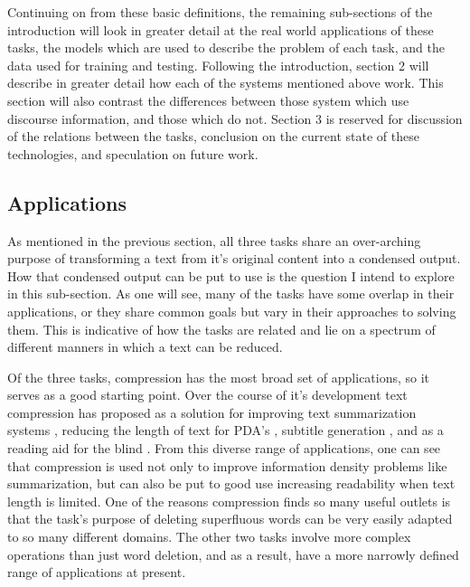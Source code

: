 {{Continuing on from these basic definitions, the remaining sub-sections of the introduction will look in greater detail at the real world applications of these tasks, the models which are used to describe the problem of each task, and the data used for training and testing.  Following the introduction, section 2 will describe in greater detail how each of the systems mentioned above work. This section will also contrast the differences between those system which use discourse information, and those which do not. Section 3 is reserved for discussion of the relations between the tasks, conclusion on the current state of these technologies, and speculation on future work.}


\subsection{Applications}


{As mentioned in the previous section, all three tasks share an over-arching purpose of transforming a text from it's original content into a condensed output. How that condensed output can be put to use is the question I intend to explore in this sub-section.  As one will see, many of the tasks have some overlap in their applications, or they share common goals but vary in their approaches to solving them.  This is indicative of how the tasks are related and lie on a spectrum of different manners in which a text can be reduced.}

{Of the three tasks, compression has the most broad set of applications, so it serves as a good starting point.  Over the course of it's development text compression has proposed as a solution for improving text summarization systems \citep{Jing:2000:SRA:974147.974190} \citep{Knight:2002:SBS:604203.604207} , reducing the length of text for PDA's \citep{corston2001text}, subtitle generation \citep{Clarke:2010:DCD:1950488.1950493}, and as a reading aid for the blind \citep{grefenstette1998producing}. From this diverse range of applications, one can see that compression is used not only to improve information density problems like summarization, but can also be put to good use increasing readability when text length is limited. One of the reasons compression finds so many useful outlets is that the task's purpose of deleting superfluous words can be very easily adapted to so many different domains.  The other two tasks involve more complex operations than just word deletion, and as a result, have a more narrowly defined range of applications at present.}

}
